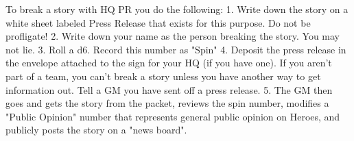 \documentclass[green]{LRSguildcamp1}
\begin{document}
To break a story with HQ PR you do the following:
1. Write down the story on a white sheet labeled Press Release that exists for this purpose. Do not be profligate! 
2. Write down your name as the person breaking the story. You may not lie. 
3. Roll a d6. Record this number as "Spin"
4. Deposit the press release in the envelope attached to the sign for your HQ (if you have one). If you aren't part of a team, you can't break a story unless you have another way to get information out. Tell a GM you have sent off a press release.
5. The GM then goes and gets the story from the packet, reviews the spin number, modifies a "Public Opinion" number that represents general public opinion on Heroes, and publicly posts the story on a "news board". 
\end{document}

